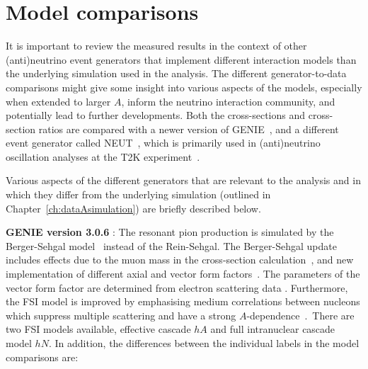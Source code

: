 \section{Model comparisons}


It is important to review the measured results in the context of other (anti)neutrino event generators that implement different interaction models than the underlying simulation used in the analysis. The different generator-to-data comparisons might give some insight into various aspects of the models, especially when extended to larger $A$, inform the neutrino interaction community, and potentially lead to further developments. Both the cross-sections and cross-section ratios are compared with a newer version of \mbox{GENIE~\cite{genie_ANDREOPOULOS201087,genie_andreopoulos2015}}, and a different event generator called NEUT~\cite{Hayato:2009zz, HayatoPickering2021}, which is primarily used in (anti)neutrino oscillation analyses at the T2K experiment~\cite{t2k_ABE2011106}.

Various aspects of the different generators that are relevant to the analysis and in which they differ from the underlying simulation (outlined in Chapter~\ref{ch:dataAsimulation}) are briefly described below.

\vspace{5pt}
\noindent \textbf{GENIE version 3.0.6} \cite{genie3}: The resonant pion production is simulated by the Berger-Sehgal model~\cite{PhysRevD.76.113004} instead of the Rein-Sehgal\cite{REIN198179}. The Berger-Sehgal update includes effects due to the muon mass in the cross-section calculation~\cite{kuzmin, coherentMass_REIN2007207,Adler_2006}, and new implementation \cite{Nowak_2009} of different axial and vector form factors~\cite{PhysRevD.77.053001}. The parameters of the vector form factor are determined from electron scattering data \cite{PhysRevD.74.014009}. Furthermore, the FSI model is improved by emphasising medium correlations between nucleons which suppress multiple scattering and have a strong $A$-dependence~\cite{genie3, PhysRevD.104.053006}.~There are two FSI models available, effective cascade $hA$ and full intranuclear cascade model $hN$. In addition, the differences between the individual labels in the model comparisons are:


